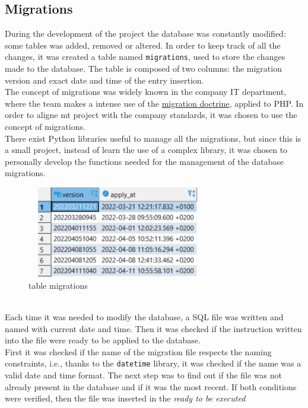\documentclass[12pt, a4paper, oneside]{article}
\begin{document}
\subsection{Migrations}
\label{subsec:migrations}
During the development of the project the database was constantly modified: some tables was added, removed or altered. In order to keep track of all the changes, it was created a table named \texttt{migrations},
used to store the changes made to the database. The table is composed of two columns: the migration version and exact date and time of the entry insertion.\\
The concept of migrations was widely known in the company IT department, where the team makes a intense use of the \href{https://www.doctrine-project.org/projects/doctrine-migrations/en/3.3/index.html}{migration doctrine}, 
applied to PHP. In order to aligne mt project with the company standards, it was chosen to use the concept of migrations. \\
There exist Python libraries useful to manage all the migrations, but since this is a small project, instead of learn the use of a complex library, it was chosen to personally develop the functions needed for the management 
of the database migrations.
\begin{figure}[h]
    \centering
    \includegraphics[width=8cm, height=4cm]{table-migrations.png}
    \caption{table migrations}
\end{figure}\\
Each time it was needed to modify the database, a SQL file was written and named with current date and time. Then it was checked if the instruction written into the file were ready to be applied to the 
database.\\
First it was checked if the name of the migration file respects the naming constraints, i.e., thanks to the \texttt{datetime} library, it was checked if the name was a valid date and time format.
The next step was to find out if the file was not already present in the database and if it was the most recent. If both conditions were verified, then the file was inserted in the \emph{ready to be executed}
\end{document}
